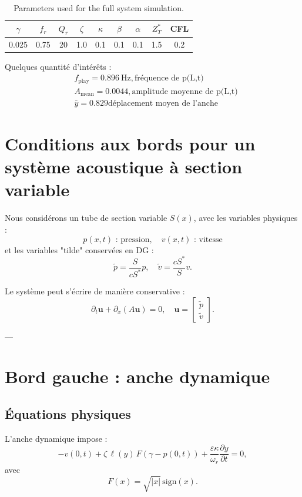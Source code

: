 \documentclass[12pt,a4paper]{article}
\begin{document}
\begin{table}[h]
\centering
\begin{tabular}{ccccccccc}
\hline
$\gamma$ & $f_r$ & $Q_r$ & $\zeta$ & $\kappa$ & $\beta$ & $\alpha$ & $Z_T^\ast$ & CFL \\
\hline
0.025 & 0.75 & 20 & 1.0 & 0.1 & 0.1 & 0.1 & 1.5 & 0.2 \\
\hline
\end{tabular}
\caption{Parameters used for the full system simulation.}
\label{tab:reed_params}
\end{table}

Quelques quantité d'intérêts : 
$$
\begin{aligned}
&f_{\mathrm{play}} = 0.896\ \mathrm{Hz}, \text{fréquence de p(L,t)} \\
&A_{\mathrm{mean}} = 0.0044, \text{amplitude moyenne de p(L,t)} \\
&\bar{y} = 0.829 \text{déplacement moyen de l'anche}
\end{aligned}
$$


\section*{Conditions aux bords pour un système acoustique à section variable}

Nous considérons un tube de section variable $S(x)$, avec les variables physiques :
\[
p(x,t) \text{ : pression}, \quad v(x,t) \text{ : vitesse}
\]
et les variables "tilde" conservées en DG :
\[
\tilde{p} = \frac{S}{c S^*} p, \quad \tilde{v} = \frac{c S^*}{S} v.
\]

Le système peut s'écrire de manière conservative :
\[
\partial_t \mathbf{u} + \partial_x (A \mathbf{u}) = 0, \quad 
\mathbf{u} = \begin{bmatrix} \tilde{p} \\ \tilde{v} \end{bmatrix}.
\]

---

\section{Bord gauche : anche dynamique}

\subsection{Équations physiques}

L'anche dynamique impose :
\begin{equation}
- v(0,t) + \zeta \, \ell(y) \, F(\gamma - p(0,t)) + \frac{\varepsilon \kappa}{\omega_r} \frac{\partial y}{\partial t} = 0,
\end{equation}
avec
\[
F(x) = \sqrt{|x|} \, \mathrm{sign}(x).
\]
\end{document}
